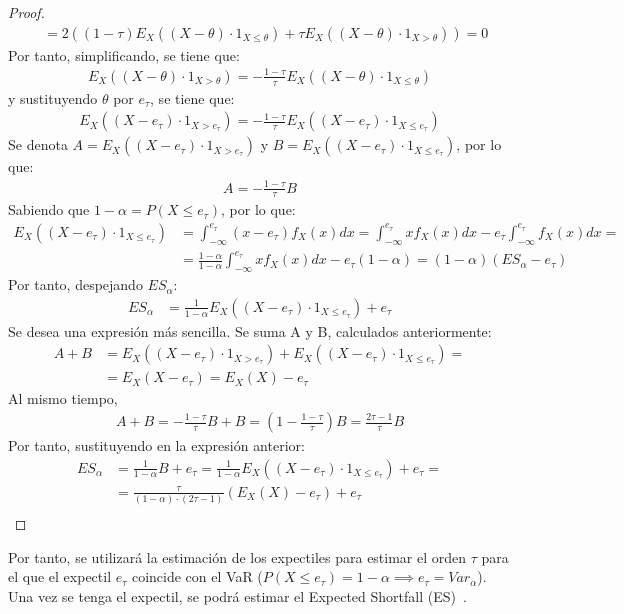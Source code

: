 \documentclass[11pt]{book}
\theoremstyle{plain} %
\theoremstyle{definition} %
\begin{document}
\begin{proof}
\begin{align*}
      &= 2((1-\tau)E_{X}((X-\theta)\cdot 1_{X\leq \theta}) + \tau E_{X}((X-\theta)\cdot 1_{X >\theta})) = 0
   \end{align*} 
   Por tanto, simplificando, se tiene que:
   \begin{align*}
      E_{X}((X-\theta)\cdot 1_{X > \theta}) = -\frac{1-\tau}{\tau}E_{X}((X-\theta)\cdot 1_{X \leq \theta})
   \end{align*}
   y sustituyendo $\theta$ por $e_\tau$, se tiene que:
   \begin{align*}
      E_{X}((X-e_\tau)\cdot 1_{X> e_\tau}) = -\frac{1-\tau}{\tau}E_{X}((X-e_\tau)\cdot 1_{X\leq e_\tau})
   \end{align*}
   Se denota $A = E_{X}((X-e_\tau)\cdot 1_{X> e_\tau})$ y $B = E_{X}((X-e_\tau)\cdot 1_{X\leq e_\tau})$, por lo que:
   \begin{align*}
      A = -\frac{1-\tau}{\tau}B
   \end{align*}
   Sabiendo que $1-\alpha = P(X \leq e_\tau)$, por lo que:
   \begin{align*}
      E_{X}((X-e_\tau)\cdot 1_{X \leq e_\tau}) &= \int_{-\infty}^{e_\tau}(x-e_\tau)f_X(x)dx = \int_{-\infty}^{e_\tau}xf_X(x)dx - e_\tau \int_{-\infty}^{e_\tau}f_X(x)dx = \\
      &= \frac{1-\alpha}{1-\alpha}\int_{-\infty}^{e_\tau}xf_X(x)dx - e_\tau (1-\alpha) = (1-\alpha) (ES_\alpha - e_\tau)
   \end{align*}
   Por tanto, despejando $ES_\alpha$:
   \begin{align*}
      ES_\alpha &= \frac{1}{1-\alpha}E_{X}((X-e_\tau)\cdot 1_{X \leq e_\tau}) + e_\tau
   \end{align*}
   Se desea una expresión más sencilla. Se suma A y B, calculados anteriormente:
   \begin{align*}
      A + B &= E_{X}((X-e_\tau)\cdot 1_{X > e_\tau}) + E_{X}((X-e_\tau)\cdot 1_{X\leq e_\tau}) = \\
      &= E_{X}(X-e_\tau) = E_{X}(X) - e_\tau
   \end{align*}
   Al mismo tiempo, 
   \begin{align*}
      A+B = -\frac{1-\tau}{\tau}B + B = \left(1 - \frac{1-\tau}{\tau}\right)B = \frac{2\tau-1}{\tau}B 
   \end{align*}
   Por tanto, sustituyendo en la expresión anterior:
   \begin{align*}
      ES_\alpha &= \frac{1}{1-\alpha}B + e_\tau = \frac{1}{1-\alpha}E_{X}((X-e_\tau)\cdot 1_{X \leq e_\tau}) + e_\tau = \\
      &= \frac{\tau}{(1-\alpha) \cdot (2\tau-1)} (E_X(X)-e_\tau)+e_\tau \\
   \end{align*}

\end{proof}
Por tanto, se utilizará la estimación de los expectiles para estimar el orden $\tau$
para el que el expectil $e_\tau$ coincide con el VaR 
($P(X \leq e_\tau) = 1-\alpha \implies e_\tau = Var_\alpha$). Una vez se tenga 
el expectil, se podrá estimar el Expected Shortfall (ES)~\cite{Taylor08}.
\end{document}
